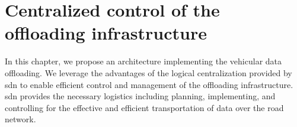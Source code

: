 \chapter{Centralized control of the offloading infrastructure}
\label{chap:implementation}


In this chapter, we propose an architecture implementing the vehicular data offloading. We leverage the advantages of the logical centralization provided by \acrfull{sdn} to enable efficient control and management of the offloading infrastructure. \acrshort{sdn} provides the necessary logistics including planning, implementing, and controlling for the effective and efficient transportation of data over the road network.  


